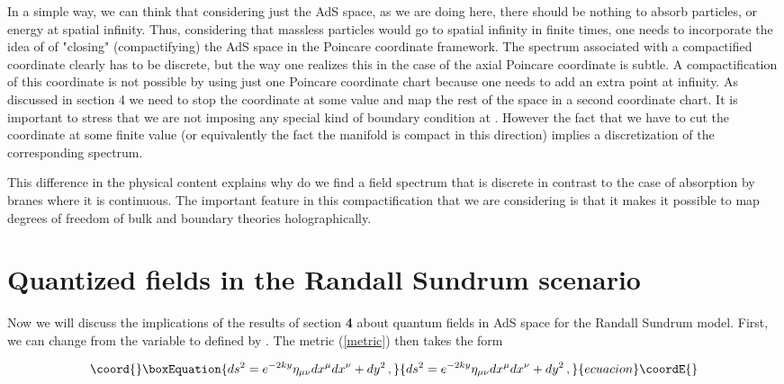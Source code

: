 \documentclass[a4paper,12pt]{article}
\begin{document}
In a simple way, we can think that considering just the AdS space, as we are
doing here,  there should be  nothing to absorb particles, or energy 
at spatial infinity. Thus, considering that massless particles would go to spatial
infinity in finite times, one needs to incorporate the idea of \cite{QAdS1,QAdS2} 
of "closing" (compactifying) the AdS space in the Poincare coordinate framework.
The spectrum associated with a compactified coordinate clearly has to be discrete, but 
the way one realizes this in the case of the axial Poincare coordinate \coordHE{} 
is subtle. A compactification of this coordinate is not possible by using 
just one Poincare coordinate chart because one needs to add an extra point at infinity.
As discussed in section 4 we need to stop the coordinate \coordHE{} at some value \coordHE{} and 
map the rest of the space in a second coordinate chart.
It is important to stress that we are not imposing any special
kind of boundary condition at \coordHE{}. However the fact that we have to cut the coordinate
\coordHE{} at some finite value (or equivalently the fact the manifold is compact 
in this direction) implies a discretization of the corresponding spectrum.



This difference in the physical content explains why do we find a 
field spectrum that is discrete in contrast to the case of 
absorption by branes where it is continuous. 
The important feature in this compactification that we are considering is that it 
makes it possible to map degrees of freedom of bulk and boundary theories
holographically\cite{BB}. 


\section{Quantized fields in the Randall Sundrum scenario}
\label{RS}


Now we will discuss the implications of the results of section {\bf 4} 
about quantum fields in AdS space for the Randall Sundrum model.
First, we can change from the variable \coordHE{} to \coordHE{} 
defined by \coordHE{}. 
The metric (\ref{metric}) then takes the form 

\begin{equation}\coord{}\boxEquation{
\label{metric3}
ds^2=e^{-2ky}\eta_{\mu\nu}dx^\mu dx^\nu +dy^2\,,
}{
ds^2=e^{-2ky}\eta_{\mu\nu}dx^\mu dx^\nu +dy^2\,,
}{ecuacion}\coordE{}\end{equation}
\end{document}
